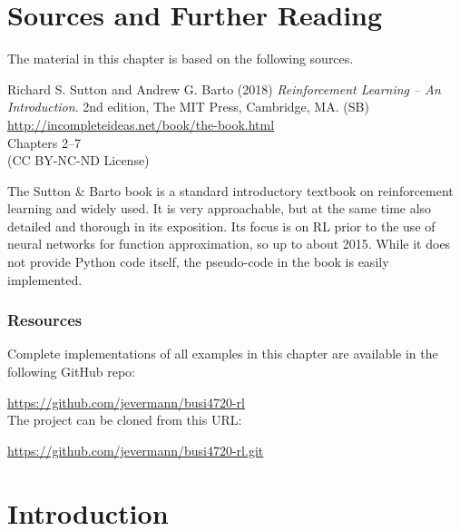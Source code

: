 %
%

\section*{Sources and Further Reading}

The material in this chapter is based on the following sources. 

\begin{tcolorbox}[colback=alert]
Richard S. Sutton and Andrew G. Barto (2018) \emph{Reinforcement Learning -- An Introduction}. 2nd edition, The MIT Press, Cambridge, MA. (SB) \\
\vspace{0.5\baselineskip}
\url{http://incompleteideas.net/book/the-book.html} \\
\vspace{0.5\baselineskip}
Chapters 2--7 \\
\vspace{0.5\baselineskip}
(CC BY-NC-ND License)
\end{tcolorbox}

The Sutton \& Barto book is a standard introductory textbook on reinforcement learning and widely used. It is very approachable, but at the same time also detailed and thorough in its exposition. Its focus is on RL prior to the use of neural networks for function approximation, so up to about 2015. While it does not provide Python code itself, the pseudo-code in the book is easily implemented.

\begin{tcolorbox}[colback=alert]
\subsubsection*{Resources}
Complete implementations of all examples in this chapter are available in the following GitHub repo:

\url{https://github.com/jevermann/busi4720-rl} \\

The project can be cloned from this URL:

\url{https://github.com/jevermann/busi4720-rl.git}
\end{tcolorbox}


\section{Introduction}

